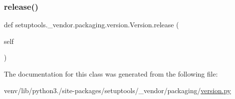 \subsubsection{\texorpdfstring{release()}{release()}}
{\footnotesize\ttfamily def setuptools.\+\_\+vendor.\+packaging.\+version.\+Version.\+release (\begin{DoxyParamCaption}\item[{}]{self }\end{DoxyParamCaption})}



The documentation for this class was generated from the following file\+:\begin{DoxyCompactItemize}
\item 
venv/lib/python3./site-\/packages/setuptools/\+\_\+vendor/packaging/\hyperlink{setuptools_2__vendor_2packaging_2version_8py}{version.\+py}\end{DoxyCompactItemize}
